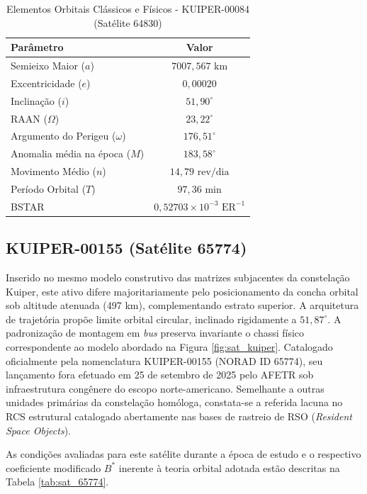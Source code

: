 \begin{table}[H]
    \centering
    \caption{Elementos Orbitais Clássicos e Físicos - KUIPER-00084 (Satélite 64830)}
    \label{tab:sat_64830}
    \begin{tabular}{lc}
        \toprule
        \textbf{Parâmetro} & \textbf{Valor} \\
        \midrule
        Semieixo Maior ($a$) & $7007,567\text{ km}$ \\
        Excentricidade ($e$) & $0,00020$ \\
        Inclinação ($i$) & $51,90^\circ$ \\
        RAAN ($\Omega$) & $23,22^\circ$ \\
        Argumento do Perigeu ($\omega$) & $176,51^\circ$ \\
        Anomalia média na época ($M$) & $183,58^\circ$ \\
        Movimento Médio ($n$) & $14,79\text{ rev/dia}$ \\
        Período Orbital ($T$) & $97,36\text{ min}$ \\
        BSTAR & $0,52703\times 10^{-3} \text{ ER}^{-1}$ \\
        \bottomrule
    \end{tabular}
\end{table}

\subsection{KUIPER-00155 (Satélite 65774)}

Inserido no mesmo modelo construtivo das matrizes subjacentes da constelação Kuiper, este ativo difere majoritariamente pelo posicionamento da concha orbital sob altitude atenuada (497 km), complementando estrato superior. A arquitetura de trajetória propõe limite orbital circular, inclinado rigidamente a $51,87^\circ$. A padronização de montagem em \textit{bus} preserva invariante o chassi físico correspondente ao modelo abordado na Figura \ref{fig:sat_kuiper}. Catalogado oficialmente pela nomenclatura KUIPER-00155 (NORAD ID 65774), seu lançamento fora efetuado em 25 de setembro de 2025 pelo AFETR sob infraestrutura congênere do escopo norte-americano. Semelhante a outras unidades primárias da constelação homóloga, constata-se a referida lacuna no RCS estrutural catalogado abertamente nas bases de rastreio de RSO (\textit{Resident Space Objects}).

As condições avaliadas para este satélite durante a época de estudo e o respectivo coeficiente modificado $B^*$ inerente à teoria orbital adotada estão descritas na Tabela \ref{tab:sat_65774}.

